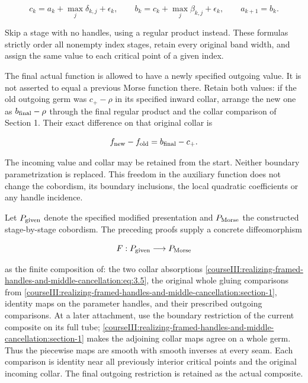 \begin{equation}
c_k=a_k+\max_j\delta_{k,j}+\epsilon_k,\qquad
 b_k=c_k+\max_j\beta_{k,j}+\epsilon_k,
 \qquad a_{k+1}=b_k .
 \label{courseIII:realizing-framed-handles-and-middle-cancellation:eq:4.1}
\end{equation}

Skip a stage with no handles, using a regular product instead. These formulas strictly order all nonempty index stages, retain every original band width, and assign the same value to each critical point of a given index.

The final actual function is allowed to have a newly specified outgoing value. It is not asserted to equal a previous Morse function there. Retain both values: if the old outgoing germ was \(c_+-\rho\) in its specified inward collar, arrange the new one as \(b_{\rm final}-\rho\) through the final regular product and the collar comparison of Section 1. Their exact difference on that original collar is

\begin{equation}
f_{\rm new}-f_{\rm old}=b_{\rm final}-c_+ .
 \label{courseIII:realizing-framed-handles-and-middle-cancellation:eq:4.2}
\end{equation}

The incoming value and collar may be retained from the start. Neither boundary parametrization is replaced. This freedom in the auxiliary function does not change the cobordism, its boundary inclusions, the local quadratic coefficients or any handle incidence.

Let \(P_{\rm given}\) denote the specified modified presentation and \(P_{\rm Morse}\) the constructed stage-by-stage cobordism. The preceding proofs supply a concrete diffeomorphism

\begin{equation}
F:P_{\rm given}\longrightarrow P_{\rm Morse}
 \label{courseIII:realizing-framed-handles-and-middle-cancellation:eq:4.3}
\end{equation}

as the finite composition of: the two collar absorptions \eqref{courseIII:realizing-framed-handles-and-middle-cancellation:eq:3.5}, the original whole gluing comparisons from \cref{courseIII:realizing-framed-handles-and-middle-cancellation:section-1}, identity maps on the parameter handles, and their prescribed outgoing comparisons. At a later attachment, use the boundary restriction of the current composite on its full tube; \cref{courseIII:realizing-framed-handles-and-middle-cancellation:section-1} makes the adjoining collar maps agree on a whole germ. Thus the piecewise maps are smooth with smooth inverses at every seam. Each comparison is identity near all previously interior critical points and the original incoming collar. The final outgoing restriction is retained as the actual composite.

